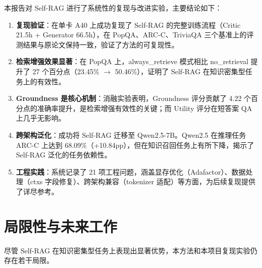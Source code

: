 \documentclass[11pt,a4paper]{article}
\begin{document}
本报告对 Self-RAG 进行了系统性的复现与改进实验，主要结论如下：

\begin{enumerate}[leftmargin=2em]
    \item \textbf{复现验证}：在单卡 A40 上成功复现了 Self-RAG 的完整训练流程（Critic 21.5h + Generator 66.5h），在 PopQA、ARC-C、TriviaQA 三个基准上的评测结果与原论文保持一致，验证了方法的可复现性。

    \item \textbf{检索增强效果显著}：在 PopQA 上，always\_retrieve 模式相比 no\_retrieval 提升了 27 个百分点（23.45\% $\to$ 50.46\%），证明了 Self-RAG 在知识密集型任务上的有效性。

    \item \textbf{Groundness 是核心机制}：消融实验表明，Groundness 评分贡献了 4.22 个百分点的准确率提升，是检索增强有效性的关键；而 Utility 评分在短答案 QA 上几乎无影响。

    \item \textbf{跨架构泛化}：成功将 Self-RAG 迁移至 Qwen2.5-7B。Qwen2.5 在推理任务 ARC-C 上达到 68.09\%（+10.84pp），但在知识召回任务上有所下降，揭示了 Self-RAG 泛化的任务依赖性。

    \item \textbf{工程实践}：系统记录了 21 项工程问题，涵盖显存优化（Adafactor）、数据处理（ctxs 字段修复）、跨架构兼容（tokenizer 适配）等方面，为后续复现提供了详尽参考。
\end{enumerate}

\section{局限性与未来工作}
\label{sec:limitations}

尽管 Self-RAG 在知识密集型任务上表现出显著优势，本方法和本项目复现实验仍存在若干局限。
\end{document}
